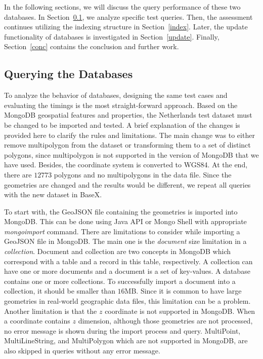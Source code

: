 \documentclass[a4paper,12pt]{article}
\begin{document}
In the following sections, we will discuss the query performance of these two databases. 
In Section~\ref{s.query}, we analyze specific test queries. Then, the assessment continues
utilizing the indexing structure in Section~\ref{index}. Later, the update functionality of databases is 
investigated in Section~\ref{update}. Finally, Section~\ref{conc} contains the conclusion and further work.

\subsection{Querying the Databases}
\label{s.query}
To analyze the behavior of databases, designing the same test cases and evaluating the timings is the most straight-forward approach. Based on the MongoDB geospatial features and properties, the Netherlands test dataset must be changed to be imported and tested. A brief explanation of the changes is provided here to clarify the rules and limitations. The main change was to either remove multipolygon from the dataset or transforming them to a set of distinct polygons, since multipolygon is not supported in the version of MongoDB that we have used. Besides, the coordinate system is converted to WGS84. At the end, there are $12773$ polygons and no multipolygons in the data file. Since the geometries are changed and the results would be different, we repeat all queries with the new dataset in BaseX.

To start with, the GeoJSON file containing the geometries is imported into MongoDB. This can be done  using Java API or Mongo Shell with appropriate \textit{mongoimport} command. There are limitations to consider while importing a GeoJSON file in MongoDB. The main one is the \textit{document} size limitation in a \textit{collection}. Document and collection are two concepts in MongoDB which correspond with a table and a record in this table, respectively. A collection can have one or more documents and a document is a set of key-values. A database contains one or more collections. To successfully import a document into a collection, it should be smaller than $16$MB. Since it is common to have large geometries in real-world geographic data files, this limitation can be a problem. Another limitation is that the $z$ coordinate is not supported in MongoDB. When a coordinate contains $z$ dimension, although those geometries are not processed, no error message is shown during the import process and query. MultiPoint, MultiLineString, and MultiPolygon which are not supported in MongoDB, are also skipped in queries without any error message. 
\end{document}
